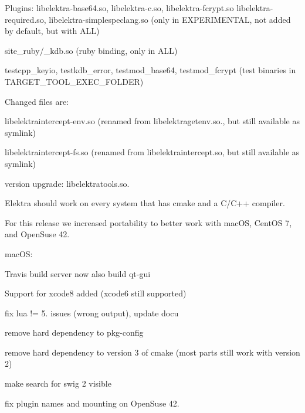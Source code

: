 \begin{DoxyItemize}
\item Plugins\+: {\ttfamily libelektra-\/base64.\+so}, {\ttfamily libelektra-\/c.\+so}, {\ttfamily libelektra-\/fcrypt.\+so} {\ttfamily libelektra-\/required.\+so}, {\ttfamily libelektra-\/simplespeclang.\+so} (only in {\ttfamily E\+X\+P\+E\+R\+I\+M\+E\+N\+T\+AL}, not added by default, but with {\ttfamily A\+LL})
\item {\ttfamily site\+\_\+ruby/\+\_\+kdb.\+so} (ruby binding, only in {\ttfamily A\+LL})
\item {\ttfamily testcpp\+\_\+keyio}, {\ttfamily testkdb\+\_\+error}, {\ttfamily testmod\+\_\+base64}, {\ttfamily testmod\+\_\+fcrypt} (test binaries in {\ttfamily T\+A\+R\+G\+E\+T\+\_\+\+T\+O\+O\+L\+\_\+\+E\+X\+E\+C\+\_\+\+F\+O\+L\+D\+ER})
\end{DoxyItemize}

Changed files are\+:


\begin{DoxyItemize}
\item {\ttfamily libelektraintercept-\/env.\+so} (renamed from {\ttfamily libelektragetenv.\+so.}, but still available as symlink)
\item {\ttfamily libelektraintercept-\/fs.\+so} (renamed from {\ttfamily libelektraintercept.\+so}, but still available as symlink)
\item version upgrade\+: {\ttfamily libelektratools.\+so.}
\end{DoxyItemize}

Elektra should work on every system that has {\ttfamily cmake} and a {\ttfamily C/\+C++} compiler.

For this release we increased portability to better work with mac\+OS, Cent\+OS 7, and Open\+Suse 42.


\begin{DoxyItemize}
\item mac\+OS\+:
\begin{DoxyItemize}
\item Travis build server now also build qt-\/gui
\item Support for xcode8 added (xcode6 still supported)
\end{DoxyItemize}
\item fix lua != 5. issues (wrong output), update docu
\item remove hard dependency to {\ttfamily pkg-\/config}
\item remove hard dependency to version 3 of {\ttfamily cmake} (most parts still work with version 2)
\item make search for swig 2 visible
\item fix plugin names and mounting on Open\+Suse 42.
\end{DoxyItemize}

